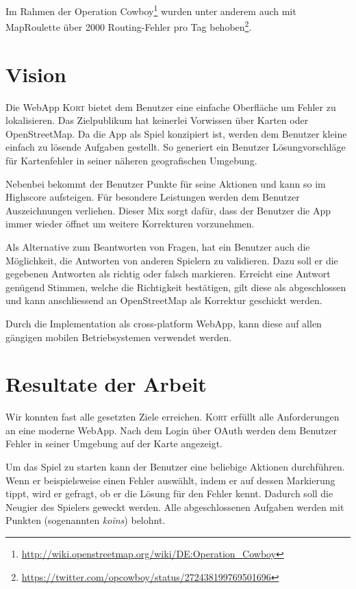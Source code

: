 Im Rahmen der Operation Cowboy\footnote{\url{http://wiki.openstreetmap.org/wiki/DE:Operation_Cowboy}} wurden unter anderem auch mit MapRoulette über 2000 Routing-Fehler pro Tag behoben\footnote{\url{https://twitter.com/opcowboy/status/272438199769501696}}.

\section{Vision}
Die \gls{WebApp} \textsc{Kort} bietet dem Benutzer eine einfache Oberfläche um Fehler zu lokalisieren.
Das Zielpublikum hat keinerlei Vorwissen über Karten oder \gls{OpenStreetMap}.
Da die App als Spiel konzipiert ist, werden dem Benutzer kleine einfach zu lösende Aufgaben gestellt.
So generiert ein Benutzer Lösungvorschläge für Kartenfehler in seiner näheren geografischen Umgebung.

Nebenbei bekommt der Benutzer Punkte für seine Aktionen und kann so im Highscore aufsteigen.
Für besondere Leistungen werden dem Benutzer Auszeichnungen verliehen.
Dieser Mix sorgt dafür, dass der Benutzer die App immer wieder öffnet um weitere Korrekturen vorzunehmen.

Als Alternative zum Beantworten von Fragen, hat ein Benutzer auch die Möglichkeit, die Antworten von anderen Spielern zu validieren.
Dazu soll er die gegebenen Antworten als richtig oder falsch markieren.
Erreicht eine Antwort genügend Stimmen, welche die Richtigkeit bestätigen, gilt diese als abgeschlossen und kann anschliessend an \gls{OpenStreetMap} als Korrektur geschickt werden.

Durch die Implementation als cross-platform \gls{WebApp}, kann diese auf allen gängigen mobilen Betriebsystemen verwendet werden.

\section{Resultate der Arbeit}
Wir konnten fast alle gesetzten Ziele erreichen.
\textsc{Kort} erfüllt alle Anforderungen an eine moderne \gls{WebApp}.
Nach dem Login über \gls{OAuth} werden dem Benutzer Fehler in seiner Umgebung auf der Karte angezeigt.

Um das Spiel zu starten kann der Benutzer eine beliebige Aktionen durchführen.
Wenn er beispielsweise einen Fehler auswählt, indem er auf dessen Markierung tippt, wird er gefragt, ob er die Lösung für den Fehler kennt.
Dadurch soll die Neugier des Spielers geweckt werden.
Alle abgeschlossenen Aufgaben werden mit Punkten (sogenannten \emph{koins}) belohnt.

